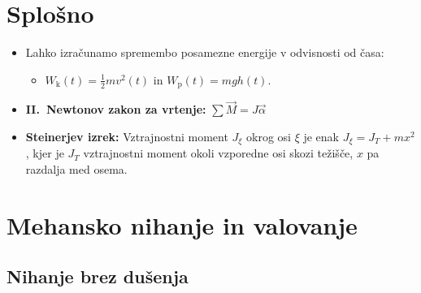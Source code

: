 \section*{Splošno}
\begin{itemize}
    \item Lahko izračunamo spremembo posamezne energije v odvisnosti od časa:
    \begin{itemize}
        \item \(W_\text{k}(t) = \frac{1}{2} m v^2(t)\) in \(W_\text{p}(t) = mgh(t).\)
    \end{itemize}
    \item \textbf{II.\ Newtonov zakon za vrtenje:} \(\sum \vec{M} = J \vec{\alpha}\)
    \item \textbf{Steinerjev izrek:} Vztrajnostni moment \(J_\xi\) okrog osi \(\xi\) je enak \(J_\xi = J_T + mx^2\), kjer je \(J_T\) vztrajnostni moment okoli vzporedne osi skozi težišče, \(x\) pa razdalja med osema.
\end{itemize}

\newpage
\section{Mehansko nihanje in valovanje}
\subsection{Nihanje brez dušenja}
